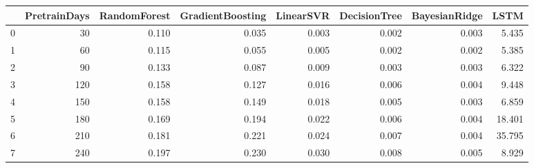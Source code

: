 \begin{tabular}{lrrrrrrr}
\toprule
{} &  PretrainDays &  RandomForest &  GradientBoosting &  LinearSVR &  DecisionTree &  BayesianRidge &   LSTM \\
\midrule
0 &            30 &         0.110 &             0.035 &      0.003 &         0.002 &          0.003 &  5.435 \\
1 &            60 &         0.115 &             0.055 &      0.005 &         0.002 &          0.002 &  5.385 \\
2 &            90 &         0.133 &             0.087 &      0.009 &         0.003 &          0.003 &  6.322 \\
3 &           120 &         0.158 &             0.127 &      0.016 &         0.006 &          0.004 &  9.448 \\
4 &           150 &         0.158 &             0.149 &      0.018 &         0.005 &          0.003 &  6.859 \\
5 &           180 &         0.169 &             0.194 &      0.022 &         0.006 &          0.004 & 18.401 \\
6 &           210 &         0.181 &             0.221 &      0.024 &         0.007 &          0.004 & 35.795 \\
7 &           240 &         0.197 &             0.230 &      0.030 &         0.008 &          0.005 &  8.929 \\
\bottomrule
\end{tabular}
